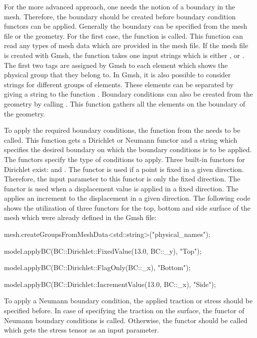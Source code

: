 For the more advanced approach, one needs the notion of a boundary in
the mesh. Therefore, the boundary should be created before boundary
condition functors can be applied. Generally the boundary can be
specified from the mesh file or the geometry.  For the first case, the
function  is called.  This function
can read any types of mesh data which are provided in the mesh
file. If the mesh file is created with Gmsh, the function takes one
input strings which is either ,  or
. The first two tags are assigned by Gmsh to
each element which shows the physical group that they belong to. In
Gmsh, it is also possible to consider strings for different groups of
elements. These elements can be separated by giving a string
 to the function
.  Boundary conditions can also be
created from the geometry by calling
. This function gathers all the
elements on the boundary of the geometry.

To apply the required boundary conditions, the function 
from the  needs to be called. This function
gets a Dirichlet or Neumann functor and a string which specifies the
desired boundary on which the boundary conditions is to be
applied. The functors specify the type of conditions to apply. Three
built-in functors for Dirichlet exist: 
and . The functor  is used if a
point is fixed in a given direction. Therefore, the input parameter to
this functor is only the fixed direction. The 
functor is used when a displacement value is applied in a fixed
direction. The  applies an increment to the
displacement in a given direction. The following code shows the
utilization of three functors for the top, bottom and side surface of
the mesh which were already defined in the Gmsh file:

\begin{cpp}
mesh.createGroupsFromMeshData<std::string>("physical_names");

model.applyBC(BC::Dirichlet::FixedValue(13.0, BC::_y), "Top");

model.applyBC(BC::Dirichlet::FlagOnly(BC::_x), "Bottom");

model.applyBC(BC::Dirichlet::IncrementValue(13.0, BC::_x), "Side");
\end{cpp}

To apply a Neumann boundary condition, the applied traction or stress
should be specified before. In case of specifying the traction on the
surface, the functor  of Neumann boundary
conditions is called. Otherwise, the functor  should
be called which gets the stress tensor as an input parameter.

